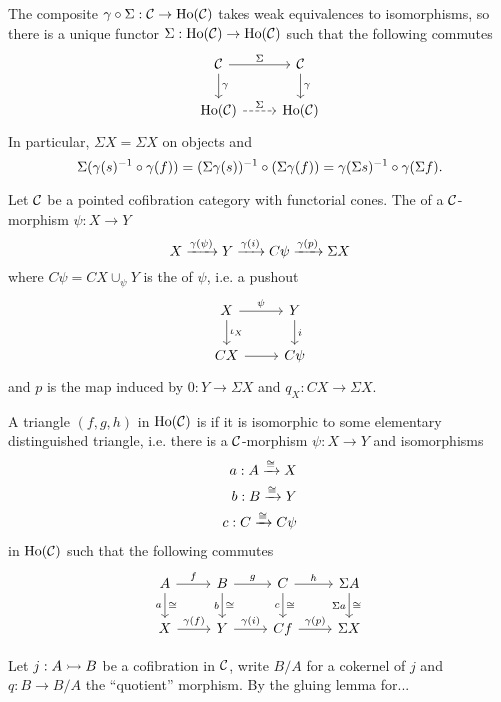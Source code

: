 The composite $\gamma\circ\Sigma:\mathcal{C}\to\operatorname{Ho}(\mathcal{C})$ takes weak equivalences to isomorphisms, so there is a unique functor $\Sigma:\operatorname{Ho}(\mathcal{C})\to\operatorname{Ho}(\mathcal{C})$ such that the following commutes
\[
\begin{tikzcd}
\Cc \ar[d,"\gamma"] \ar[r,"\Sigma"] & \Cc \ar[d,"\gamma"]\\
\Ho(\Cc) \ar[r,dashed,"\Sigma"] & \Ho(\Cc)
\end{tikzcd}
\]
In particular, $\Sigma X=\Sigma X$ on objects and
\[\Sigma(\gamma(s)^{-1}\circ\gamma(f))=(\Sigma\gamma(s))^{-1}\circ(\Sigma\gamma(f))=\gamma(\Sigma s)^{-1}\circ\gamma(\Sigma f).\]

\begin{construction}
Let $\mathcal{C}$ be a pointed cofibration category with functorial cones. The  of a $\mathcal{C}$-morphism $\psi:X\to Y$
\[X\xrightarrow{\gamma(\psi)}Y\xrightarrow{\gamma(i)}C\psi\xrightarrow{\gamma(p)}\Sigma X\]
where $C\psi=CX\cup_\psi Y$ is the  of $\psi$, i.e. a pushout
\[
\begin{tikzcd}
X \ar[d,"\iota_X"] \ar[r,"\psi"] & Y \ar[d,"i"]\\
CX \ar[r] & C\psi
\end{tikzcd}
\]
and $p$ is the map induced by $0:Y\to \Sigma X$ and $q_X:CX\to\Sigma X$.
\end{construction}

A triangle $(f,g,h)$ in $\operatorname{Ho}(\mathcal{C})$ is  if it is isomorphic to some elementary distinguished triangle, i.e. there is a $\mathcal{C}$-morphism $\psi:X\to Y$ and isomorphisms
\begin{align*}
    a:A\xrightarrow{\cong}X\\
    b:B\xrightarrow{\cong}Y\\
    c:C\xrightarrow{\cong}C\psi
\end{align*}
in $\operatorname{Ho}(\mathcal{C})$ such that the following commutes
\[
\begin{tikzcd}
A \ar[d,"a"',"\cong"] \ar[r,"f"] & B \ar[d,"b"',"\cong"] \ar[r,"g"] & C \ar[d,"c"',"\cong"] \ar[r,"h"] & \Sigma A \ar[d,"\Sigma a"',"\cong"]\\
X \ar[r,"\gamma(f)"] & Y \ar[r,"\gamma(i)"] & Cf \ar[r,"\gamma(p)"] & \Sigma X
\end{tikzcd}
\]

\begin{construction}
Let $j:A\rightarrowtail B$ be a cofibration in $\mathcal{C}$, write $B/A$ for a cokernel of $j$ and $q:B\to B/A$ the \enquote{quotient} morphism. By the gluing lemma for...
\medskip
{}
\smallskip
\end{construction}

